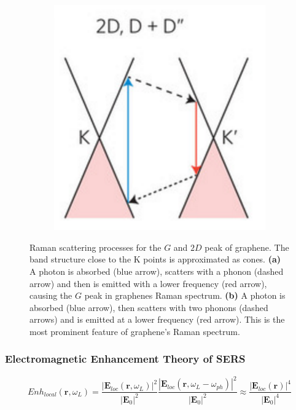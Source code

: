 \begin{figure}[!h]
\begin{subfigure}{0.2\textwidth}
  \end{subfigure}
  ~
  \begin{subfigure}{0.45\textwidth}
    \includegraphics[width=\textwidth]{./images/2d-mode.png}
  \end{subfigure}
  \caption{Raman scattering processes for the $G$ and $2D$ peak of graphene. The band structure close to the K points is approximated as cones. \textbf{(a)} A photon is absorbed (blue arrow), scatters with a phonon (dashed arrow) and then is emitted with a lower frequency (red arrow), causing the $G$ peak in graphenes Raman spectrum. \textbf{(b)} A photon is absorbed (blue arrow), then scatters with two phonons (dashed arrows) and is emitted at a lower frequency (red arrow). This is the most prominent feature of graphene's Raman spectrum. }
\end{figure}

\null\newpage
\null\newpage

\subsubsection{Electromagnetic Enhancement Theory of SERS}

\begin{equation}
  Enh_{local}(\mathbf{r},\omega_L)=\frac{\left|\mathbf{E}_{loc}(\mathbf{r}, \omega_L)\right|^2}{\left|\mathbf{E}_0\right|^2}\frac{\left|\mathbf{E}_{loc}(\mathbf{r}, \omega_L-\omega_{ph})\right|^2}{\left|\mathbf{E}_0\right|^2}\approx\frac{\left|\mathbf{E}_{loc}(\mathbf{r})\right|^4}{\left|\mathbf{E}_0\right|^4}
  \label{el-enhancement}
\end{equation}

